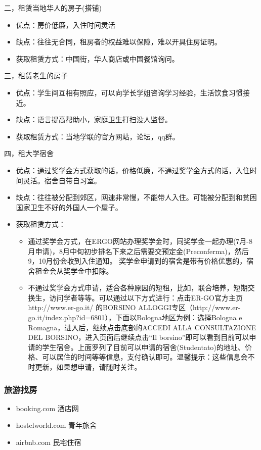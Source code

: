 二，租赁当地华人的房子(搭铺)
\begin{itemize}
\item 优点：房价低廉，入住时间灵活
\item 缺点：往往无合同，租房者的权益难以保障，难以开具住房证明。
\item 获取租赁方式：中国街，华人商店或中国餐馆询问。
\end{itemize} 

三，租赁老生的房子
\begin{itemize}
\item 优点：学生间互相有照应，可以向学长学姐咨询学习经验，生活饮食习惯接近。
\item 缺点：语言提高帮助小，家庭卫生打扫没人监督。
\item 获取租赁方式：当地学联的官方网站，论坛，qq群。
\end{itemize} 

四，租大学宿舍
\begin{itemize}
\item 优点：通过奖学金方式获取的话，价格低廉，不通过奖学金方式的话，入住时间灵活。宿舍自带自习室。
\item 缺点：往往被分配到郊区，网速非常慢，不能带人入住。可能被分配到和贫困国家卫生不好的外国人一个屋子。
\item 获取租赁方式：
	\begin{itemize}
		\item 通过奖学金方式，在ERGO网站办理奖学金时，同奖学金一起办理(7月-8月申请)，8月中旬初步排名下来之后需要交预定金(Preconferma)，然后9，10月份会收到入住通知。 奖学金申请到的宿舍是带有价格优惠的，宿舍租金会从奖学金中扣除。
		\item 不通过奖学金方式申请，适合各种原因的短租，比如，联合培养，短期交换生，访问学者等等。可以通过以下方式进行：点击ER-GO官方主页 http://www.er-go.it/ 的BORSINO ALLOGGI专区（http://www.er-go.it/index.php?id=6801），下面以Bologna地区为例：选择Bologna e Romagna，进入后，继续点击底部的ACCEDI ALLA CONSULTAZIONE DEL BORSINO，进入页面后继续点击“Il borsino”即可以看到目前可以申请的学生宿舍。上面罗列了目前可以申请的宿舍(Studentato)的地址、价格、可以居住的时间等等信息，支付确认即可。温馨提示：这些信息会不时更新，如果想申请，请随时关注。
	\end{itemize} 
\end{itemize} 

\subsubsection{旅游找房}
\begin{itemize}
\item booking.com 酒店网
\item hostelworld.com 青年旅舍
\item airbnb.com 民宅住宿
\end{itemize} 


